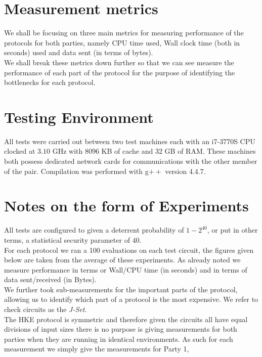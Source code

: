 \documentclass[ %
                    author={Nicholas Tutte},
                supervisor={Prof. Nigel Smart},
                    degree={MEng},
                     title={Secure Two Party Computation},
                  subtitle={A practical comparison of recent protocols},
                      type={Research - GG1K},
                      year={2015} ]{dissertation}
\begin{document}
		\section{Measurement metrics}
			We shall be focusing on three main metrics for measuring performance of the protocols for both parties, namely CPU time used, Wall clock time (both in seconds) used and data sent (in terms of bytes).\\

			We shall break these metrics down further so that we can see measure the performance of each part of the protocol for the purpose of identifying the bottlenecks for each protocol.

		\section{Testing Environment}
			All tests were carried out between two test machines each with an i7-3770S CPU clocked at $3.10$ GHz with $8096$ KB of cache and $32$ GB of RAM. These machines both possess dedicated network cards for communications with the other member of the pair. Compilation was performed with g$++$ version 4.4.7. 


		\section{Notes on the form of Experiments}
			All tests are configured to given a deterrent probability of $1 - 2^{40}$, or put in other terms, a statistical security parameter of $40$.\\

			For each protocol we ran a 100 evaluations on each test circuit, the figures given below are taken from the average of these experiments. As already noted we measure performance in terms or Wall/CPU time (in seconds) and in terms of data sent/received (in Bytes).\\

			We further took sub-measurements for the important parts of the protocol, allowing us to identify which part of a protocol is the most expensive. We refer to check circuits as the \emph{J-Set}.\\

			The HKE protocol is symmetric and therefore given the circuits all have equal divisions of input sizes there is no purpose is giving measurements for both parties when they are running in identical environments. As such for each measurement we simply give the measurements for Party 1, 
\end{document}
